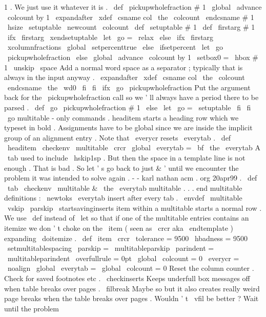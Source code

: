 {1
.
We
just
use
it
whatever
it
is
.
%
\
def
\
pickupwholefraction
#
1
{
%
\
global
\
advance
\
colcount
by
1
\
expandafter
\
xdef
\
csname
col
\
the
\
colcount
\
endcsname
{
#
1
\
hsize
}
%
\
setuptable
}
\
newcount
\
colcount
\
def
\
setuptable
#
1
{
%
\
def
\
firstarg
{
#
1
}
%
\
ifx
\
firstarg
\
xendsetuptable
\
let
\
go
=
\
relax
\
else
\
ifx
\
firstarg
\
xcolumnfractions
\
global
\
setpercenttrue
\
else
\
ifsetpercent
\
let
\
go
\
pickupwholefraction
\
else
\
global
\
advance
\
colcount
by
1
\
setbox0
=
\
hbox
{
#
1
\
unskip
\
space
}
%
Add
a
normal
word
space
as
a
%
separator
;
typically
that
is
always
in
the
input
anyway
.
\
expandafter
\
xdef
\
csname
col
\
the
\
colcount
\
endcsname
{
\
the
\
wd0
}
%
\
fi
\
fi
\
ifx
\
go
\
pickupwholefraction
%
Put
the
argument
back
for
the
\
pickupwholefraction
call
so
%
we
'
ll
always
have
a
period
there
to
be
parsed
.
\
def
\
go
{
\
pickupwholefraction
#
1
}
%
\
else
\
let
\
go
=
\
setuptable
\
fi
%
\
fi
\
go
}
%
multitable
-
only
commands
.
%
%
headitem
starts
a
heading
row
which
we
typeset
in
bold
.
%
Assignments
have
to
be
global
since
we
are
inside
the
implicit
group
%
of
an
alignment
entry
.
Note
that
\
everycr
resets
\
everytab
.
\
def
\
headitem
{
\
checkenv
\
multitable
\
crcr
\
global
\
everytab
=
{
\
bf
}
\
the
\
everytab
}
%
%
%
A
\
tab
used
to
include
\
hskip1sp
.
But
then
the
space
in
a
template
%
line
is
not
enough
.
That
is
bad
.
So
let
'
s
go
back
to
just
&
'
until
%
we
encounter
the
problem
it
was
intended
to
solve
again
.
%
-
-
karl
nathan
acm
.
org
20apr99
.
\
def
\
tab
{
\
checkenv
\
multitable
&
\
the
\
everytab
}
%
%
multitable
.
.
.
end
multitable
definitions
:
%
\
newtoks
\
everytab
%
insert
after
every
tab
.
%
\
envdef
\
multitable
{
%
\
vskip
\
parskip
\
startsavinginserts
%
%
item
within
a
multitable
starts
a
normal
row
.
%
We
use
\
def
instead
of
\
let
so
that
if
one
of
the
multitable
entries
%
contains
an
itemize
we
don
'
t
choke
on
the
\
item
(
seen
as
\
crcr
aka
%
\
endtemplate
)
expanding
\
doitemize
.
\
def
\
item
{
\
crcr
}
%
%
\
tolerance
=
9500
\
hbadness
=
9500
\
setmultitablespacing
\
parskip
=
\
multitableparskip
\
parindent
=
\
multitableparindent
\
overfullrule
=
0pt
\
global
\
colcount
=
0
%
\
everycr
=
{
%
\
noalign
{
%
\
global
\
everytab
=
{
}
%
\
global
\
colcount
=
0
%
Reset
the
column
counter
.
%
Check
for
saved
footnotes
etc
.
\
checkinserts
%
Keeps
underfull
box
messages
off
when
table
breaks
over
pages
.
%
\
filbreak
%
Maybe
so
but
it
also
creates
really
weird
page
breaks
when
the
%
table
breaks
over
pages
.
Wouldn
'
t
\
vfil
be
better
?
Wait
until
the
%
problem
}}}}
